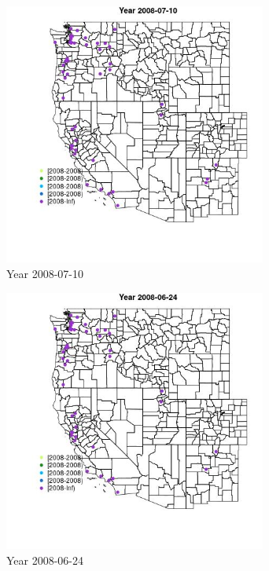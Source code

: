 \begin{figure} 
\centering  
\includegraphics[width=0.77\textwidth]{Code_Outputs/Report_ML_input_PM25_Step4_part_e_de_duplicated_aves_MapObsYear2008-07-10.jpg} 
\caption{\label{fig:Report_ML_input_PM25_Step4_part_e_de_duplicated_avesMapObsYear2008-07-10}Year 2008-07-10} 
\end{figure} 
 

\clearpage 

\begin{figure} 
\centering  
\includegraphics[width=0.77\textwidth]{Code_Outputs/Report_ML_input_PM25_Step4_part_e_de_duplicated_aves_MapObsYear2008-06-24.jpg} 
\caption{\label{fig:Report_ML_input_PM25_Step4_part_e_de_duplicated_avesMapObsYear2008-06-24}Year 2008-06-24} 
\end{figure} 
 

